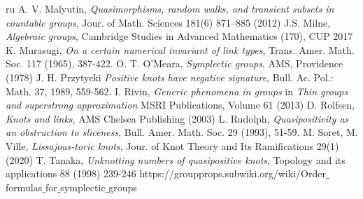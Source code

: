 \documentclass[10pt,a4paper]{amsart}
\begin{document}
\begin{thebibliography}{ru}
 		 A. V. Malyutin, {\it Quasimorphisms, random walks, and transient subsets in countable groups}, 	
 		Jour. of Math. Sciences 181(6) 871--885  (2012)
 			 J.S. Milne, {\it Algebraic groups}, Cambridge Studies in Advanced Mathematics (170), CUP 2017
 			K. Murasugi, {\it On a certain numerical invariant of link types}, Trans. Amer. Math.
 			Soc. 117 (1965), 387-422. 
 			 O. T. O'Meara, {\it Symplectic groups}, AMS, Providence (1978)
 				 J. H. Przytycki {\it Positive knots have negative signature}, Bull. Ac. Pol.: Math. 37, 1989, 559-562.
 		 I. Rivin, {\it Generic phenomena in groups} in {\it Thin groups and superstrong approximation} MSRI Publications, Volume 61 (2013) 
 		 D. Rolfsen, {\it Knots and links}, AMS Chelsea Publishing (2003) 
  L. Rudolph, {\it Quasipositivity as an obstruction to sliceness}, Bull. Amer. Math. Soc. 29 (1993), 51-59.
 	 M. Soret, M. Ville, {\it Lissajous-toric knots},  Jour. of Knot Theory and Its Ramifications 29(1) (2020) 
 	 T. Tanaka, {\it Unknotting numbers  of quasipositive knots}, Topology and its applications 88 (1998) 239-246
 	 https://groupprops.subwiki.org/wiki/Order$\_$formulas$\_$for$\_$symplectic$\_$groups
 \end{thebibliography}
\end{document}
